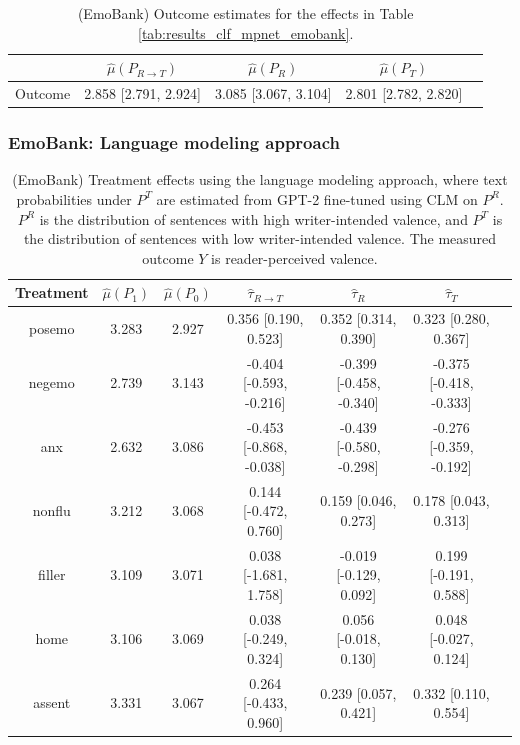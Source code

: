 \documentclass{article}
\begin{document}
\begin{table}[!ht]
\centering
\begin{tabular}{c|cccc}
\toprule
    & $\hat{\mu}(P_{R \rightarrow T})$   & $\hat{\mu}(P_R)$     & $\hat{\mu}(P_T)$     \\
\midrule
    Outcome & 2.858 [2.791, 2.924]               & 3.085 [3.067, 3.104] & 2.801 [2.782, 2.820] \\
\bottomrule
\end{tabular}
\caption{(EmoBank) Outcome estimates for the effects in Table \ref{tab:results_clf_mpnet_emobank}.}
\label{tab:results_clf_mpnet_emobank_outcome}
\end{table}

\newpage
\subsubsection{EmoBank: Language modeling approach}

\begin{table}[!ht]
\centering
\begin{tabular}{c|cccccc}
\toprule
    Treatment   &   $\hat{\mu}(P_1)$ &   $\hat{\mu}(P_0)$ & $\hat{\tau}_{R \rightarrow T}$   & $\hat{\tau}_R$          & $\hat{\tau}_T$          \\
\midrule
    posemo      &              3.283 &              2.927 & 0.356 [0.190, 0.523]             & 0.352 [0.314, 0.390]    & 0.323 [0.280, 0.367]    \\
    negemo      &              2.739 &              3.143 & -0.404 [-0.593, -0.216]          & -0.399 [-0.458, -0.340] & -0.375 [-0.418, -0.333] \\
    anx         &              2.632 &              3.086 & -0.453 [-0.868, -0.038]          & -0.439 [-0.580, -0.298] & -0.276 [-0.359, -0.192] \\
    nonflu      &              3.212 &              3.068 & 0.144 [-0.472, 0.760]            & 0.159 [0.046, 0.273]    & 0.178 [0.043, 0.313]    \\
    filler      &              3.109 &              3.071 & 0.038 [-1.681, 1.758]            & -0.019 [-0.129, 0.092]  & 0.199 [-0.191, 0.588]   \\
    home        &              3.106 &              3.069 & 0.038 [-0.249, 0.324]            & 0.056 [-0.018, 0.130]   & 0.048 [-0.027, 0.124]   \\
    assent      &              3.331 &              3.067 & 0.264 [-0.433, 0.960]            & 0.239 [0.057, 0.421]    & 0.332 [0.110, 0.554]    \\
\bottomrule
\end{tabular}
\caption{(EmoBank) Treatment effects using the language modeling approach, where text probabilities under $P^T$ are estimated from GPT-2 fine-tuned using CLM on $P^R$. $P^R$ is the distribution of sentences with high writer-intended valence, and $P^T$ is the distribution of sentences with low writer-intended valence. The measured outcome $Y$ is reader-perceived valence.}
\label{tab:results_clm_gpt2_finetuned_emobank_pr}
\end{table}
\end{document}
